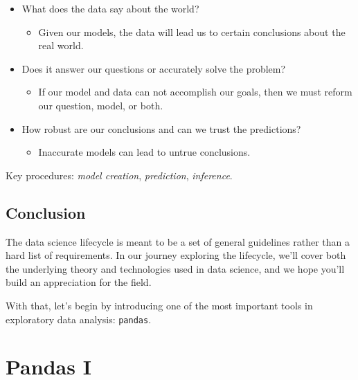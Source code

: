 \documentclass[
  letterpaper,
  DIV=11,
  numbers=noendperiod]{scrreprt}
\providecommand{\tightlist}{%
  \setlength{\itemsep}{0pt}\setlength{\parskip}{0pt}}\usepackage{longtable,booktabs,array}
\begin{document}
\begin{itemize}
\tightlist
\item
  What does the data say about the world?

  \begin{itemize}
  \tightlist
  \item
    Given our models, the data will lead us to certain conclusions about
    the real world.\\
  \end{itemize}
\item
  Does it answer our questions or accurately solve the problem?

  \begin{itemize}
  \tightlist
  \item
    If our model and data can not accomplish our goals, then we must
    reform our question, model, or both.\\
  \end{itemize}
\item
  How robust are our conclusions and can we trust the predictions?

  \begin{itemize}
  \tightlist
  \item
    Inaccurate models can lead to untrue conclusions.
  \end{itemize}
\end{itemize}

Key procedures: \emph{model creation}, \emph{prediction},
\emph{inference}.

\hypertarget{conclusion}{%
\section{Conclusion}\label{conclusion}}

The data science lifecycle is meant to be a set of general guidelines
rather than a hard list of requirements. In our journey exploring the
lifecycle, we'll cover both the underlying theory and technologies used
in data science, and we hope you'll build an appreciation for the field.

With that, let's begin by introducing one of the most important tools in
exploratory data analysis: \texttt{pandas}.


\hypertarget{pandas-i}{%
\chapter{Pandas I}\label{pandas-i}}
\end{document}
